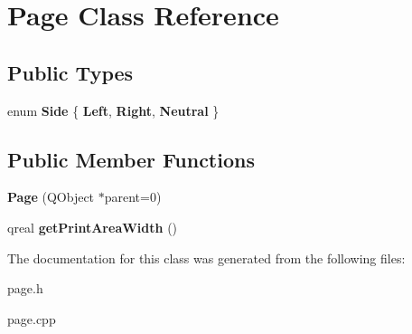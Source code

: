 \hypertarget{class_page}{
\section{Page Class Reference}
\label{class_page}
}
\subsection*{Public Types}
\begin{DoxyCompactItemize}
\item 
enum {\bfseries Side} \{ {\bfseries Left}, 
{\bfseries Right}, 
{\bfseries Neutral}
 \}
\end{DoxyCompactItemize}
\subsection*{Public Member Functions}
\begin{DoxyCompactItemize}
\item 
\hypertarget{class_page_aba931881296a0540169912242fc0c184}{
{\bfseries Page} (QObject $\ast$parent=0)}
\label{class_page_aba931881296a0540169912242fc0c184}

\item 
\hypertarget{class_page_a14ea8cc2f4f461c1ba59fd7bd8a85ea9}{
qreal {\bfseries getPrintAreaWidth} ()}
\label{class_page_a14ea8cc2f4f461c1ba59fd7bd8a85ea9}

\end{DoxyCompactItemize}


The documentation for this class was generated from the following files:\begin{DoxyCompactItemize}
\item 
page.h\item 
page.cpp\end{DoxyCompactItemize}
